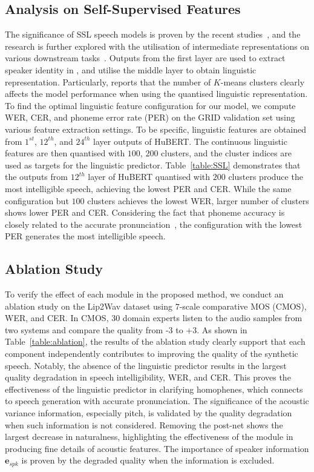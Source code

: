 \documentclass[letterpaper]{article} %
\begin{document}
\subsection{Analysis on Self-Supervised Features}
The significance of SSL speech models is proven by the recent studies~\cite{baevski2020wav2vec,hsu2021hubert}, and the research is further explored with the utilisation of intermediate representations on various downstream tasks~\cite{yang21c_interspeech,chang2022distilhubert}.
Outputs from the first layer are used to extract speaker identity in \cite{fan2020exploring,choi2021neural}, and \cite{lakhotia2021generative,lee2022hierspeech} utilise the middle layer to obtain linguistic representation.
Particularly, \cite{lakhotia2021generative} reports that the number of $K$-means clusters clearly affects the model performance when using the quantised linguistic representation.  To find the optimal linguistic feature configuration for our model, we compute WER, CER, and phoneme error rate (PER) on the GRID validation set using various feature extraction settings.
To be specific, linguistic features are obtained from $1^{st}$, $12^{th}$, and $24^{th}$ layer outputs of HuBERT. The continuous linguistic features are then quantised with $100$, $200$ clusters, and the cluster indices are used as targets for the linguistic predictor.
Table~\ref{table:SSL} demonstrates that the outputs from $12^{th}$ layer of HuBERT quantised with $200$ clusters produce the most intelligible speech, achieving the lowest PER and CER.
While the same configuration but $100$ clusters achieves the lowest WER, larger number of clusters shows lower PER and CER. Considering the fact that phoneme accuracy is closely related to the accurate pronunciation~\cite{zhang2022mixed}, the configuration with the lowest PER generates the most intelligible speech.

\subsection{Ablation Study}
\label{sec:ablation}

To verify the effect of each module in the proposed method, we conduct an ablation study on the Lip2Wav dataset using $7$-scale comparative MOS (CMOS), WER, and CER.
In CMOS, 30 domain experts listen to the audio samples from two systems and compare the quality from -$3$ to +$3$.  As shown in Table~\ref{table:ablation}, the results of the ablation study clearly support that each component independently contributes to improving the quality of the synthetic speech.
Notably, the absence of the linguistic predictor results in the largest quality degradation in speech intelligibility, WER, and CER. This proves the effectiveness of the linguistic predictor in clarifying homophenes, which connects to speech generation with accurate pronunciation.
The significance of the acoustic variance information, especially pitch, is validated by the quality degradation when such information is not considered.
Removing the post-net shows the largest decrease in naturalness, highlighting the effectiveness of the module in producing fine details of acoustic features.
The importance of speaker information $\boldsymbol{e}_{spk}$ is proven by the degraded quality when the information is excluded.
\end{document}
